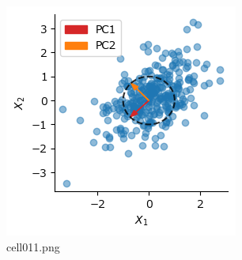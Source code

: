 \begin{figure}[ht]
	\centering
	\includegraphics[scale=0.8, max width=\linewidth]{./fig/local-learning-rule/pca-hebbian-learning/cell011.png}
	\caption{cell011.png}
	\label{cell011.png}
\end{figure}